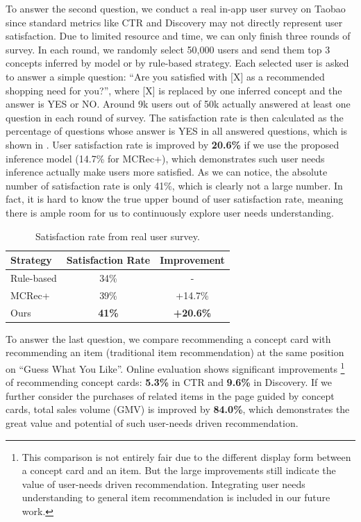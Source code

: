 To answer the second question,
we conduct a real in-app user survey on Taobao since standard metrics like CTR and Discovery may not directly represent user satisfaction.  
Due to limited resource and time, we can only finish three rounds of survey.
In each round, we randomly select 50,000 users and send them top 3 concepts inferred by model or by rule-based strategy. 
Each selected user is asked to answer a simple question: ``Are you satisfied with [X] as a recommended shopping need for you?'', where [X] is replaced by one inferred concept and the answer is YES or NO.
Around 9k users out of 50k actually answered at least one question in each round of survey.
The satisfaction rate is then calculated as the percentage of questions whose answer is YES in all answered questions, 
which is shown in .
User satisfaction rate is improved by \textbf{20.6\%} if we use the proposed inference model (14.7\% for MCRec+), which demonstrates such user needs inference actually make users more satisfied.
As we can notice, the absolute number of satisfaction rate is only 41\%,
which is clearly not a large number. 
In fact, it is hard to know the true upper bound of user satisfaction rate, meaning there is ample room for us to continuously explore user needs understanding. 

\begin{table}[th]
	\centering
	\begin{tabular}{l|c|c}
		\hline
		Strategy  &  Satisfaction Rate  & Improvement\\ 
		\hline
		Rule-based  &  34\% & -\\ 
		MCRec+  &  39\% & +14.7\% \\ 
		Ours  &  \textbf{41\%} & \textbf{+20.6\%} \\
		\hline
	\end{tabular}
	\caption{Satisfaction rate from real user survey.}
	\label{tab:survey}
\end{table}


To answer the last question, 
we compare recommending a concept card with 
recommending an item (traditional item recommendation)
at the same position on ``Guess What You Like''.
Online evaluation shows significant improvements \footnote{This comparison is not entirely fair due to the different display form between a concept card and an item. 
	But the large improvements still indicate the value of user-needs driven recommendation. Integrating user needs understanding to general item recommendation is included in our future work.} of recommending concept cards:
\textbf{5.3\%} in CTR and \textbf{9.6\%} in Discovery.
If we further consider the purchases of related items in the page guided by concept cards, total sales volume (GMV) is improved by \textbf{84.0\%}, which demonstrates the great value and potential of such user-needs driven recommendation.


